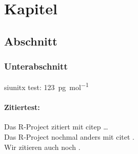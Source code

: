 \chapter{Kapitel}

\section{Abschnitt}

\subsection{Unterabschnitt}
siunitx test: \SI{123}{\pico\gram\per\mole}

\blindtext

\subsubsection{Zitiertest:}
Das R-Project zitiert mit citep \citep{RPROJECT} \dots \\
Das R-Project nochmal anders mit citet \citet{RPROJECT}. \\
Wir zitieren auch noch \citep{KM80}. \\
